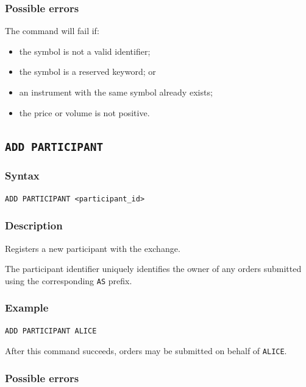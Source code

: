 \documentclass{article}
\begin{document}
\subsubsection*{Possible errors}

The command will fail if:

\begin{itemize}
    \item the symbol is not a valid identifier;
    \item the symbol is a reserved keyword; or
    \item an instrument with the same symbol already exists;
    \item the price or volume is not positive.
\end{itemize}

\subsection{\texttt{ADD PARTICIPANT}}

\subsubsection*{Syntax}

\begin{lstlisting}
ADD PARTICIPANT <participant_id>
\end{lstlisting}

\subsubsection*{Description}

Registers a new participant with the exchange.

The participant identifier uniquely identifies the owner of any orders
submitted using the corresponding \texttt{AS} prefix.

\subsubsection*{Example}

\begin{lstlisting}
ADD PARTICIPANT ALICE
\end{lstlisting}

After this command succeeds, orders may be submitted on behalf of
\texttt{ALICE}.

\subsubsection*{Possible errors}
\end{document}

